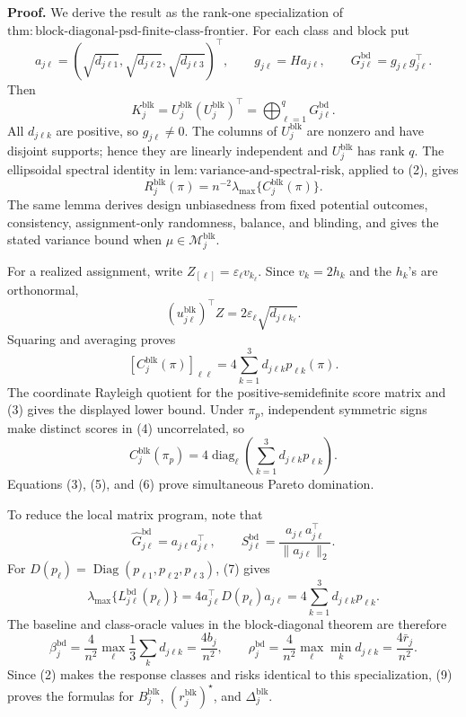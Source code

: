\textbf{Proof.}
We derive the result as the rank-one specialization of \(\mathrm{thm:block\text{-}diagonal\text{-}psd\text{-}finite\text{-}class\text{-}frontier}\).  For each class and block put
\[
a_{j\ell}=(\sqrt{d_{j\ell1}},\sqrt{d_{j\ell2}},\sqrt{d_{j\ell3}})^\top,
\qquad
g_{j\ell}=Ha_{j\ell},
\qquad
G^{\mathrm{bd}}_{j\ell}=g_{j\ell}g_{j\ell}^\top.
\tag{1}
\]
Then
\[
K_j^{\mathrm{blk}}
=U_j^{\mathrm{blk}}(U_j^{\mathrm{blk}})^\top
=\bigoplus_{\ell=1}^qG^{\mathrm{bd}}_{j\ell}.
\tag{2}
\]
All \(d_{j\ell k}\) are positive, so \(g_{j\ell}\ne0\).  The columns of \(U_j^{\mathrm{blk}}\) are nonzero and have disjoint supports; hence they are linearly independent and \(U_j^{\mathrm{blk}}\) has rank \(q\).  The ellipsoidal spectral identity in \(\mathrm{lem:variance\text{-}and\text{-}spectral\text{-}risk}\), applied to (2), gives
\[
R_j^{\mathrm{blk}}(\pi)
=n^{-2}\lambda_{\max}\{C_j^{\mathrm{blk}}(\pi)\}.
\tag{3}
\]
The same lemma derives design unbiasedness from fixed potential outcomes, consistency, assignment-only randomness, balance, and blinding, and gives the stated variance bound when \(\mu\in\mathcal M_j^{\mathrm{blk}}\).

For a realized assignment, write \(Z_{[\ell]}=\varepsilon_\ell v_{k_\ell}\).  Since \(v_k=2h_k\) and the \(h_k\)'s are orthonormal,
\[
(u_{j\ell}^{\mathrm{blk}})^\top Z
=2\varepsilon_\ell\sqrt{d_{j\ell k_\ell}}.
\tag{4}
\]
Squaring and averaging proves
\[
[C_j^{\mathrm{blk}}(\pi)]_{\ell\ell}
=4\sum_{k=1}^3d_{j\ell k}p_{\ell k}(\pi).
\tag{5}
\]
The coordinate Rayleigh quotient for the positive-semidefinite score matrix and (3) gives the displayed lower bound.  Under \(\pi_p\), independent symmetric signs make distinct scores in (4) uncorrelated, so
\[
C_j^{\mathrm{blk}}(\pi_p)
=4\operatorname{diag}_{\ell}
\left(\sum_{k=1}^3d_{j\ell k}p_{\ell k}\right).
\tag{6}
\]
Equations (3), (5), and (6) prove simultaneous Pareto domination.

To reduce the local matrix program, note that
\[
\widehat G^{\mathrm{bd}}_{j\ell}=a_{j\ell}a_{j\ell}^\top,
\qquad
S^{\mathrm{bd}}_{j\ell}
=\frac{a_{j\ell}a_{j\ell}^\top}{\|a_{j\ell}\|_2}.
\tag{7}
\]
For \(D(p_\ell)=\operatorname{Diag}(p_{\ell1},p_{\ell2},p_{\ell3})\), (7) gives
\[
\lambda_{\max}\{L^{\mathrm{bd}}_{j\ell}(p_\ell)\}
=4a_{j\ell}^\top D(p_\ell)a_{j\ell}
=4\sum_{k=1}^3d_{j\ell k}p_{\ell k}.
\tag{8}
\]
The baseline and class-oracle values in the block-diagonal theorem are therefore
\[
\beta_j^{\mathrm{bd}}
=\frac4{n^2}\max_\ell\frac13\sum_kd_{j\ell k}
=\frac{4b_j}{n^2},
\qquad
\rho_j^{\mathrm{bd}}
=\frac4{n^2}\max_\ell\min_kd_{j\ell k}
=\frac{4\bar r_j}{n^2}.
\tag{9}
\]
Since (2) makes the response classes and risks identical to this specialization, (9) proves the formulas for \(B_j^{\mathrm{blk}}\), \((r_j^{\mathrm{blk}})^\star\), and \(\Delta_j^{\mathrm{blk}}\).

